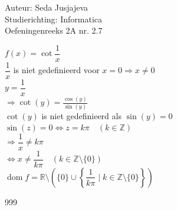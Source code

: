 \documentclass[a4paper]{article}
\begin{document}
\noindent \large Auteur: Seda Jusjajeva\\
\noindent \large Studierichting: Informatica\\
\noindent \large Oefeningenreeks 2A nr. 2.7 \\

\medskip

\normalsize

$f(x) = \cot\dfrac{1}{x}$ \\

$\dfrac{1}{x}$ is niet gedefinieerd voor $x = 0\Rightarrow x \neq 0$ \\

$y=\dfrac{1}{x}$ \\

$\Rightarrow \cot(y)=\frac{\cos(y)}{\sin(y)}$ \\

$\cot(y)$ is niet gedefinieerd als $\sin(y)=0$ \\

$\sin(z)=0 \iff z=k\pi \quad (k\in\mathbb{Z})$ \\

$\Rightarrow\dfrac{1}{x} \neq k\pi$ \\

$\Leftrightarrow x \neq \dfrac{1}{k\pi} \quad (k\in\mathbb{Z}\setminus\{0\})$ \\

$\operatorname{dom}f=\mathbb{R}\setminus\left(\{0\}\cup\left\{\dfrac{1}{k\pi}\mid k\in\mathbb{Z}\setminus\{0\}\right\}\right)$ \\

\begin{thebibliography}{999}
\end{thebibliography}
\end{document}
